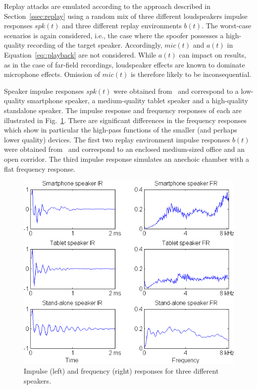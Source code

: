 
Replay attacks are emulated according to the approach described in Section~\ref{ssec:replay} 
using a random mix of three different loudspeakers impulse responses $spk(t)$ and three different replay environments $b(t)$.  
The worst-case scenarios is again considered, i.e., the case where the spoofer possesses a high-quality recording of the target speaker.  Accordingly, $mic(t)$ and $a(t)$ in Equation~\ref{eq::playback} are not considered.  While $a(t)$ can impact on results, as in the case of far-field recordings, loudspeaker effects are known to dominate microphone effects.  Omission of $mic(t)$ is therefore likely to be inconsequential.

Speaker impulse responses $spk(t)$ were obtained from~\cite{Brown2014} and correspond to a low-quality smartphone speaker, a medium-quality tablet speaker and a high-quality standalone speaker.  The impulse response and frequency responses of each are illustrated in Fig.~\ref{fig::IRs}.  There are significant differences in the frequency responses which show in particular the high-pass functions of the smaller (and perhaps lower quality) devices.   The first two replay environment impulse responses $b(t)$ were obtained from~\cite{Jeub2009} and correspond to an enclosed medium-sized office and an open corridor.   %
The third impulse response simulates an anechoic chamber with a flat frequency response. 


\begin{figure}
	\centering
	\includegraphics[width=1\linewidth]{Figs/IRs.png}
	\caption{Impulse (left) and frequency (right) responses for three different speakers.} %
	\label{fig::IRs}
\end{figure}


